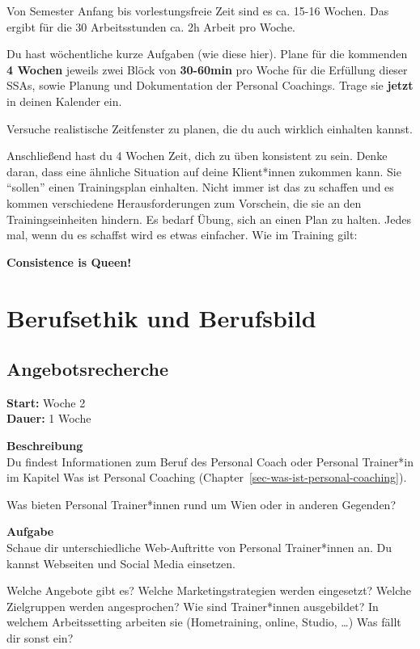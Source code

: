 \documentclass[
  letterpaper,
  DIV=11,
  numbers=noendperiod]{scrreprt}
\begin{document}
Von Semester Anfang bis vorlestungsfreie Zeit sind es ca. 15-16 Wochen.
Das ergibt für die 30 Arbeitsstunden ca. 2h Arbeit pro Woche.

Du hast wöchentliche kurze Aufgaben (wie diese hier). Plane für die
kommenden \textbf{4 Wochen} jeweils zwei Blöck von \textbf{30-60min} pro
Woche für die Erfüllung dieser SSAs, sowie Planung und Dokumentation der
Personal Coachings. Trage sie \textbf{jetzt} in deinen Kalender ein.

Versuche realistische Zeitfenster zu planen, die du auch wirklich
einhalten kannst.

Anschließend hast du 4 Wochen Zeit, dich zu üben konsistent zu sein.
Denke daran, dass eine ähnliche Situation auf deine Klient*innen
zukommen kann. Sie ``sollen'' einen Trainingsplan einhalten. Nicht immer
ist das zu schaffen und es kommen verschiedene Herausforderungen zum
Vorschein, die sie an den Trainingseinheiten hindern. Es bedarf Übung,
sich an einen Plan zu halten. Jedes mal, wenn du es schaffst wird es
etwas einfacher. Wie im Training gilt:

\textbf{Consistence is Queen!}

\section{Berufsethik und Berufsbild}\label{berufsethik-und-berufsbild}

\subsection{Angebotsrecherche}\label{angebotsrecherche}

\textbf{Start:} Woche 2\\
\textbf{Dauer:} 1 Woche

\textbf{Beschreibung}\\
Du findest Informationen zum Beruf des Personal Coach oder Personal
Trainer*in im Kapitel Was ist Personal Coaching
(Chapter~\ref{sec-was-ist-personal-coaching}).

Was bieten Personal Trainer*innen rund um Wien oder in anderen Gegenden?

\textbf{Aufgabe}\\
Schaue dir unterschiedliche Web-Auftritte von Personal Trainer*innen an.
Du kannst Webseiten und Social Media einsetzen.

Welche Angebote gibt es? Welche Marketingstrategien werden eingesetzt?
Welche Zielgruppen werden angesprochen? Wie sind Trainer*innen
ausgebildet? In welchem Arbeitssetting arbeiten sie (Hometraining,
online, Studio, \ldots) Was fällt dir sonst ein?
\end{document}
